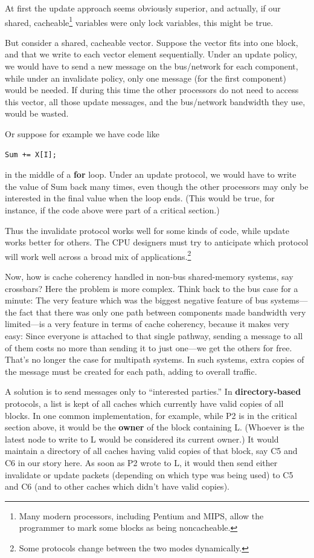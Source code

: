 At first the update approach seems obviously superior, and actually, if
our shared, cacheable\footnote{ Many modern processors, including
Pentium and MIPS, allow the programmer to mark some blocks as being
noncacheable.} variables were only lock variables, this might be true.

But consider a shared, cacheable vector. Suppose the vector fits into
one block, and that we write to each vector element sequentially. Under
an update policy, we would have to send a new message on the bus/network
for each component, while under an invalidate policy, only one message
(for the first component) would be needed. If during this time the other
processors do not need to access this vector, all those update messages,
and the bus/network bandwidth they use, would be wasted.

Or suppose for example we have code like

\begin{Verbatim}[fontsize=\relsize{-2}]
Sum += X[I];
\end{Verbatim}

in the middle of a \textbf{for} loop. Under an update protocol, we would
have to write the value of Sum back many times, even though the other
processors may only be interested in the final value when the loop ends.
(This would be true, for instance, if the code above were part of a
critical section.)

Thus the invalidate protocol works well for some kinds of code, while
update works better for others.  The CPU designers must try to
anticipate which protocol will work well across a broad mix of
applications.\footnote{Some protocols change between the two modes
dynamically.}

Now, how is cache coherency handled in non-bus shared-memory systems,
say crossbars?  Here the problem is more complex. Think back to the bus
case for a minute: The very feature which was the biggest negative
feature of bus systems---the fact that there was only one path between
components made bandwidth very limited---is a very 
feature in terms of cache coherency, because it makes
 very easy: Since everyone is attached to that
single pathway, sending a message to all of them costs no more than
sending it to just one---we get the others for free. That's no longer
the case for multipath systems. In such systems, extra copies of the
message must be created for each path, adding to overall traffic.

A solution is to send messages only to ``interested parties.'' In
\textbf{directory-based} protocols, a list is kept of all caches
which currently have valid copies of all blocks. In one common
implementation, for example, while P2 is in the critical section above,
it would be the \textbf{owner} of the block containing L. (Whoever is
the latest node to write to L would be considered its current owner.) It
would maintain a directory of all caches having valid copies of that
block, say C5 and C6 in our story here. As soon as P2 wrote to L, it
would then send either invalidate or update packets (depending on which
type was being used) to C5 and C6 (and  to other caches
which didn't have valid copies).

